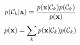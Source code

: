 $$p({\cal C}_k | {\bf x}) = \frac{p({\bf x}|{\cal C}_k)p({\cal C}_k)}{p({\bf x})}$$
$$p({\bf x})=\sum _k p({\bf x}|{\cal C}_k)p({\cal C}_k) $$
